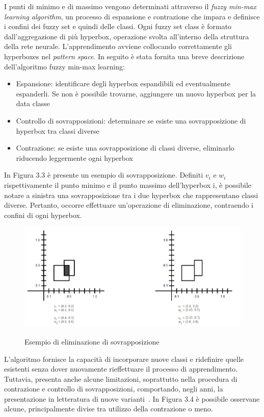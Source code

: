 \documentclass[11pt,  oneside, openany]{book}
\begin{document}
I punti di minimo e di massimo vengono determinati attraverso il \textit{fuzzy min-max learning algorithm}, un processo di espansione e contrazione che impara e definisce i confini dei fuzzy set e quindi delle classi. Ogni fuzzy set class è formato dall'aggregazione di più hyperbox, operazione svolta all'interno della struttura della rete neurale. L'apprendimento avviene collocando correttamente gli hyperboxes nel \textit{pattern space}. In seguito è stata fornita una breve descrizione dell'algoritmo fuzzy min-max learning: 

\begin{itemize}
\item Espansione: identificare degli hyperbox espandibili ed eventualmente espanderli. Se non è possibile trovarne, aggiungere un nuovo hyperbox per la data classe
\item Controllo di sovrapposizioni: determinare se esiste una sovrapposizione di hyperbox tra classi diverse
\item Contrazione: se esiste una sovrapposizione di classi diverse, eliminarlo riducendo leggermente ogni hyperbox
\end{itemize}

In Figura 3.3 è presente un esempio di sovrapposizione. Definiti $v_i$ e $w_i$ rispettivamente il punto minimo e il punto massimo dell'hyperbox i, è possibile notare a sinistra una sovrapposizione tra i due hyperbox che rappresentano classi diverse. Pertanto, occorre effettuare un'operazione di eliminazione, contraendo i confini di ogni hyperbox. 

\begin{figure}[h!]
\begin{center}
  \includegraphics[width=12cm]{Immagini/elimination_overlap.png}\\
  \caption{Esempio di eliminazione di sovrapposizione}
\end{center}
\end{figure}


L'algoritmo fornisce la capacità di incorporare nuove classi e ridefinire quelle esistenti senza dover nuovamente rieffettuare il processo di apprendimento. Tuttavia, presenta anche alcune limitazioni, soprattutto nella procedura di contrazione e controllo di sovrapposizioni, comportando, negli anni, la presentazione in letteratura di nuove varianti~\cite{fmmnn_variants}. In Figura 3.4 è possibile osservane alcune, principalmente divise tra utilizzo della contrazione o meno. 
\end{document}
